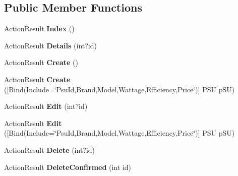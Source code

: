 \subsection*{Public Member Functions}
\begin{DoxyCompactItemize}
\item 
Action\+Result {\bfseries Index} ()\hypertarget{class_p_c_builder_m_v_c_1_1_controllers_1_1_p_s_u_controller_a091077c612db8f41b3fdc91d8f40ee1a}{}\label{class_p_c_builder_m_v_c_1_1_controllers_1_1_p_s_u_controller_a091077c612db8f41b3fdc91d8f40ee1a}

\item 
Action\+Result {\bfseries Details} (int?id)\hypertarget{class_p_c_builder_m_v_c_1_1_controllers_1_1_p_s_u_controller_aa11ba9390a2ade5a7780fde7184ad605}{}\label{class_p_c_builder_m_v_c_1_1_controllers_1_1_p_s_u_controller_aa11ba9390a2ade5a7780fde7184ad605}

\item 
Action\+Result {\bfseries Create} ()\hypertarget{class_p_c_builder_m_v_c_1_1_controllers_1_1_p_s_u_controller_aab12c9297ccd422406759d10486b4089}{}\label{class_p_c_builder_m_v_c_1_1_controllers_1_1_p_s_u_controller_aab12c9297ccd422406759d10486b4089}

\item 
Action\+Result {\bfseries Create} (\mbox{[}Bind(Include=\char`\"{}Psu\+Id,Brand,Model,Wattage,Efficiency,Price\char`\"{})\mbox{]} P\+SU p\+SU)\hypertarget{class_p_c_builder_m_v_c_1_1_controllers_1_1_p_s_u_controller_a3f8a86f6901b123fd7f481a9d69f4e85}{}\label{class_p_c_builder_m_v_c_1_1_controllers_1_1_p_s_u_controller_a3f8a86f6901b123fd7f481a9d69f4e85}

\item 
Action\+Result {\bfseries Edit} (int?id)\hypertarget{class_p_c_builder_m_v_c_1_1_controllers_1_1_p_s_u_controller_a0cd44180c3a4e4571745bcc26f4f125a}{}\label{class_p_c_builder_m_v_c_1_1_controllers_1_1_p_s_u_controller_a0cd44180c3a4e4571745bcc26f4f125a}

\item 
Action\+Result {\bfseries Edit} (\mbox{[}Bind(Include=\char`\"{}Psu\+Id,Brand,Model,Wattage,Efficiency,Price\char`\"{})\mbox{]} P\+SU p\+SU)\hypertarget{class_p_c_builder_m_v_c_1_1_controllers_1_1_p_s_u_controller_ad171810d48df24733a5314645121e61b}{}\label{class_p_c_builder_m_v_c_1_1_controllers_1_1_p_s_u_controller_ad171810d48df24733a5314645121e61b}

\item 
Action\+Result {\bfseries Delete} (int?id)\hypertarget{class_p_c_builder_m_v_c_1_1_controllers_1_1_p_s_u_controller_a50c3976316e118165f74e9f9e89dec75}{}\label{class_p_c_builder_m_v_c_1_1_controllers_1_1_p_s_u_controller_a50c3976316e118165f74e9f9e89dec75}

\item 
Action\+Result {\bfseries Delete\+Confirmed} (int id)\hypertarget{class_p_c_builder_m_v_c_1_1_controllers_1_1_p_s_u_controller_ac313c3b328777eb91f58d7fa8dbb6d16}{}\label{class_p_c_builder_m_v_c_1_1_controllers_1_1_p_s_u_controller_ac313c3b328777eb91f58d7fa8dbb6d16}

\end{DoxyCompactItemize}
